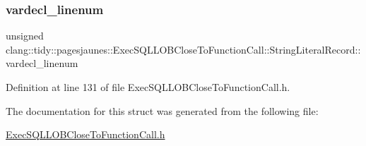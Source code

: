 \subsubsection{\texorpdfstring{vardecl\+\_\+linenum}{vardecl\_linenum}}
{\footnotesize\ttfamily unsigned clang\+::tidy\+::pagesjaunes\+::\+Exec\+S\+Q\+L\+L\+O\+B\+Close\+To\+Function\+Call\+::\+String\+Literal\+Record\+::vardecl\+\_\+linenum}



Definition at line 131 of file Exec\+S\+Q\+L\+L\+O\+B\+Close\+To\+Function\+Call.\+h.



The documentation for this struct was generated from the following file\+:\begin{DoxyCompactItemize}
\item 
\hyperlink{_exec_s_q_l_l_o_b_close_to_function_call_8h}{Exec\+S\+Q\+L\+L\+O\+B\+Close\+To\+Function\+Call.\+h}\end{DoxyCompactItemize}

